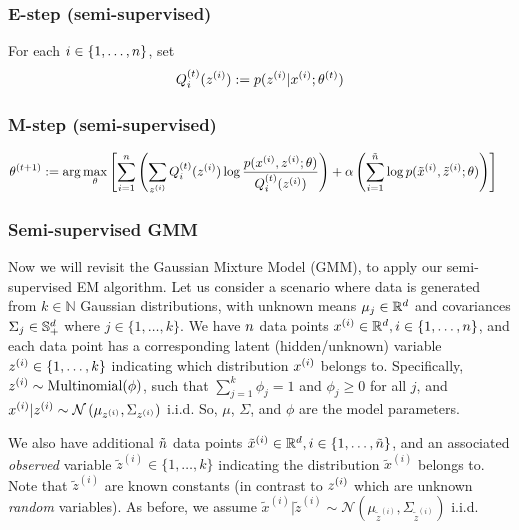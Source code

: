 \subsubsection*{E-step (semi-supervised)}

For each $i \in \{1,\ldots,{n}\}$, set
\begin{align*}
    Q_i^{(t)}(z^{(i)}) := p(z^{(i)}|x^{(i)};\theta^{(t)})
\end{align*}

\subsubsection*{M-step (semi-supervised)}

\begin{align*}
    \theta^{(t+1)} &:= \arg\max_\theta\left[ \sum_{i=1}^{n}\left( \sum_{z^{(i)}} Q^{(t)}_i(z^{(i)}) \log \frac{ p(x^{(i)}, z^{(i)};\theta) }{ Q^{(t)}_i(z^{(i)})}\right)  + \alpha \left(\sum_{i=1}^{\tilde{{n}}} \log p(\tilde{x}^{(i)},\tilde{z}^{(i)};\theta)\right)\right]
\end{align*}

\begin{enumerate}
  
\ifnum{} {
  
} \fi

\end{enumerate}


\subsubsection*{Semi-supervised GMM}
Now we will revisit the Gaussian Mixture Model (GMM), to apply our semi-supervised EM algorithm. Let us consider a scenario where data is generated from $k \in \mathbb{N}$ Gaussian distributions, with unknown means $\mu_j \in \mathbb{R}^{d}$ and covariances $\Sigma_j \in \mathbb{S}_+^{d}$ where $j \in \{1,\ldots,k\}$. We have ${n}$ data points $x^{(i)} \in \mathbb{R}^{d}, i \in \{1,\ldots,{n}\}$, and each data point has a corresponding latent (hidden/unknown) variable $z^{(i)} \in \{1,\ldots,k\}$ indicating which distribution $x^{(i)}$ belongs to. Specifically, $z^{(i)} \sim \text{Multinomial}(\phi)$, such that $\sum_{j=1}^k\phi_j = 1$ and $\phi_j \ge 0$ for all $j$, and $x^{(i)}|z^{(i)} \sim \mathcal{N}\left(\mu_{z^{(i)}}, \Sigma_{z^{(i)}}\right)$ i.i.d. So, $\mu$, $\Sigma$, and $\phi$ are the model parameters.

We also have additional $\tilde{{n}}$ data points $\tilde{x}^{(i)} \in \mathbb{R}^{d}, i \in \{1,\ldots,\tilde{{n}}\}$, and an associated \emph{observed} variable $\tilde{z}^{(i)} \in \{1,\ldots,k\}$ indicating the distribution $\tilde{x}^{(i)}$ belongs to. Note that $\tilde{z}^{(i)}$ are known constants (in contrast to $z^{(i)}$ which are unknown \emph{random} variables). As before, we assume $\tilde{x}^{(i)}|\tilde{z}^{(i)} \sim \mathcal{N}\left(\mu_{\tilde{z}^{(i)}}, \Sigma_{\tilde{z}^{(i)}}\right)$ i.i.d.


